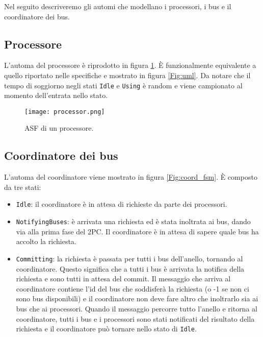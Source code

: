 
\noindent
Nel seguito descriveremo gli automi che modellano i processori, i bus e il coordinatore dei bus.

\subsection{Processore} 
L'automa del processore è riprodotto in figura \ref{Fig:proc_fsm}. È funzionalmente equivalente a quello riportato nelle specifiche e mostrato in figura \ref{Fig:uml}. Da notare che il tempo di soggiorno negli stati \texttt{Idle} e \texttt{Using} è random e viene campionato al momento dell'entrata nello stato.

\begin{figure}
\vspace{-1cm}
\centerline{
	\texttt{[image: processor.png]}
}
\caption{ASF di un processore.}
\label{Fig:proc_fsm}
\end{figure}

\pagebreak

\subsection{Coordinatore dei bus} 
L'automa del coordinatore viene mostrato in figura \ref{Fig:coord_fsm}. È composto da tre stati:

\begin{itemize}
\item \texttt{Idle}: il coordinatore è in attesa di richieste da parte dei processori.
\item \texttt{NotifyingBuses}: è arrivata una richiesta ed è stata inoltrata ai bus, dando via alla prima fase del 2PC. Il coordinatore è in attesa di sapere quale bus ha accolto la richiesta.
\item \texttt{Committing}: la richiesta è passata per tutti i bus dell'anello, tornando al coordinatore. Questo significa che a tutti i bus è arrivata la notifica della richiesta e sono tutti in attesa del commit. Il messaggio che arriva al coordinatore contiene l'id del bus che soddisferà la richiesta (o -1 se non ci sono bus disponibili) e il coordinatore non deve fare altro che inoltrarlo sia ai bus che ai processori. Quando il messaggio percorre tutto l'anello e ritorna al coordinatore, tutti i bus e i processori sono stati notificati del risultato della richiesta e il coordinatore può tornare nello stato di \texttt{Idle}.
\end{itemize}

